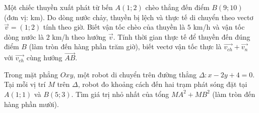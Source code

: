 \begin{bt}%
	Một chiếc thuyền xuất phát từ bến $A(1;2)$ chèo thẳng đến điểm $B(9;10)$ (đơn vị: km). Do dòng nước chảy, thuyền bị lệch và thực tế di chuyển theo vectơ $\overrightarrow{v}=(1;2)$ tính theo giờ. Biết vận tốc chèo của thuyền là $5$ km/h và vận tốc dòng nước là $2$ km/h theo hướng $\overrightarrow{v}$. Tính thời gian thực tế để thuyền đến đúng điểm $B$ (làm tròn đến hàng phần trăm giờ), biết vectơ vận tốc thực là $\overrightarrow{v_{ch}}+\overrightarrow{v_n}$ với $\overrightarrow{v_{ch}}$ cùng hướng $\overrightarrow{AB}$.
	
\end{bt}

\begin{bt}%
	Trong mặt phẳng $Oxy$, một robot di chuyển trên đường thẳng $\Delta\colon x-2y+4=0$. Tại mỗi vị trí $M$ trên $\Delta$, robot đo khoảng cách đến hai trạm phát sóng đặt tại $A(1;1)$ và $B(5;3)$. Tìm giá trị nhỏ nhất của tổng $MA^2+MB^2$ (làm tròn đến hàng phần mười).
	
\end{bt}

